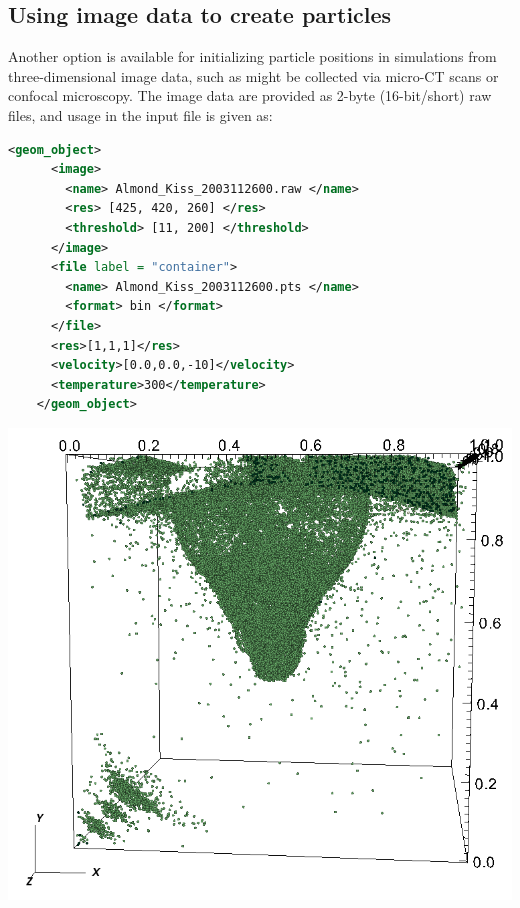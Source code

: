 \subsection{Using image data to create particles}
\begin{minipage}[t]{0.6\textwidth}
  \vspace{0pt}
  Another option is available for initializing particle positions in \MPM
  simulations from three-dimensional image data,
  such as might be collected via micro-CT scans or confocal microscopy.  The image data are 
  provided as 2-byte (16-bit/short) raw files, and usage in the input file is given as:
  \begin{lstlisting}[language=XML]
    <geom_object>
      <image>
        <name> Almond_Kiss_2003112600.raw </name>
        <res> [425, 420, 260] </res>
        <threshold> [11, 200] </threshold>
      </image>
      <file label = "container">
        <name> Almond_Kiss_2003112600.pts </name>
        <format> bin </format>
      </file>
      <res>[1,1,1]</res>
      <velocity>[0.0,0.0,-10]</velocity>
      <temperature>300</temperature>
    </geom_object>
  \end{lstlisting}
\end{minipage}
\hspace{12pt}
\begin{minipage}[t]{0.35\textwidth}
  \vspace{0pt}
  \centering
  \includegraphics[width=0.9\columnwidth]{FIGS/geometry/geom_image.png}
\end{minipage}

